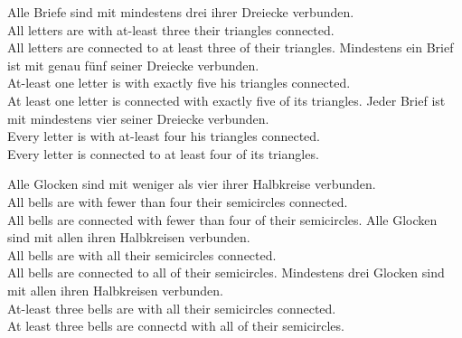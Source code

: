 \documentclass[fleqn,reqno,10pt,draft]{article}
\begin{document}
\begin{exe}
  \ex \label{bsp:controls-as}
    \begin{xlist}
\ex \label{bsp:controls-as-1} \gll Alle Briefe sind mit mindestens drei ihrer Dreiecke verbunden.\\
  All letters are with at-least three their triangles connected.\\
  \trans All letters are connected to at least three of their triangles.
\ex \label{bsp:controls-as-2} \gll Mindestens ein Brief ist mit genau f\"unf seiner Dreiecke verbunden.\\
  At-least one letter is with exactly five his triangles connected.\\
  \trans At least one letter is connected with exactly five of its triangles.
\ex \label{bsp:controls-as-3} \gll Jeder Brief ist mit mindestens vier seiner Dreiecke verbunden.\\
  Every letter is with at-least four his triangles connected.\\
  \trans Every letter is connected to at least four of its triangles.
\end{xlist}
\end{exe}

\begin{exe}
\ex \label{bsp:controls-es}
  \begin{xlist}
\ex \label{bsp:controls-es-1} \gll Alle Glocken sind mit weniger als
  vier ihrer Halbkreise verbunden. \\ 
All bells are with fewer than four their semicircles connected.\\
\trans All bells are connected with fewer than four of their semicircles.  
\ex \label{bsp:controls-es-2} \gll Alle Glocken sind mit allen ihren Halbkreisen verbunden.\\
All bells are with all their semicircles connected.\\
\trans All bells are connected to all of their semicircles. 
\ex \label{bsp:controls-es-3} \gll Mindestens drei Glocken sind mit
  allen ihren Halbkreisen verbunden.\\ 
  At-least three bells are with all  their semicircles connected.\\
  \trans At least three bells are connectd with all of their semicircles.
\end{xlist}
\end{exe}
\end{document}
